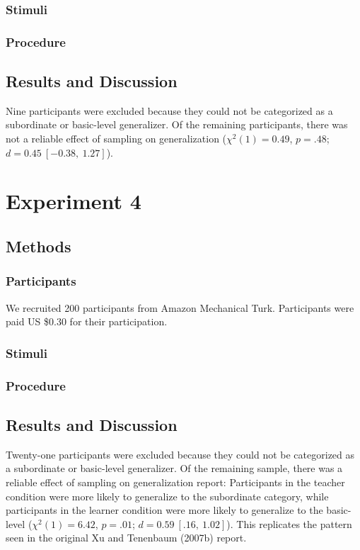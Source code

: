 \documentclass[man]{apa2}
\begin{document}
\subsubsection{Stimuli}


\subsubsection{Procedure}

\subsection{Results and Discussion}

Nine participants were excluded because they could not be categorized as a subordinate or basic-level generalizer. Of the remaining participants, there was not a reliable effect of sampling on generalization ($\chi^2(1) = 0.49$,  $p = .48$; $d = 0.45\ [-0.38,\ 1.27]$).


\section{Experiment 4}


\subsection{Methods}

\subsubsection{Participants}   We recruited 200 participants from Amazon Mechanical Turk. Participants were paid US \$0.30 for their participation.

\subsubsection{Stimuli}


\subsubsection{Procedure}

\subsection{Results and Discussion}


Twenty-one participants were excluded because they could not be categorized as a subordinate or basic-level generalizer. Of the remaining sample, there was a reliable effect of sampling on generalization report: Participants in the teacher condition were more likely to generalize to the subordinate category, while participants in the learner condition were more likely to generalize to the basic-level ($\chi^2(1) = 6.42$,  $p = .01$; $d = 0.59\ [.16,\ 1.02]$). This replicates the pattern seen in the original Xu and Tenenbaum (2007b) report.
\end{document}
